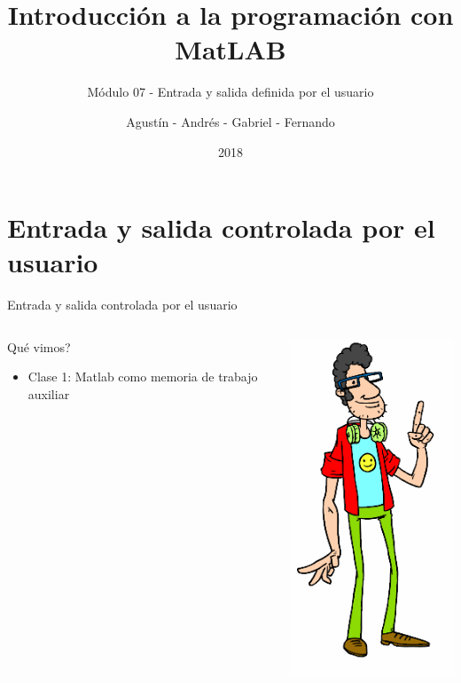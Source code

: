 \documentclass{bredelebeamer}
\title[Programación en MatLAB]{Introducción a la programación con MatLAB}
\subtitle{Módulo 07 - Entrada y salida definida por el usuario}
\author{Agustín - Andrés - Gabriel - Fernando\inst{1}}
\institute[UTN.BA]
{
  \inst{1}%
  Universidad Tecnológica Nacional\\
  Facultad Regional Buenos Aires
  }
\date{2018}
\begin{document}
\begin{frame}
  \titlepage 
\end{frame}





\section{Entrada y salida controlada por el usuario}

\begin{frame}{Entrada y salida controlada por el usuario}
\begin{columns}
\begin{column}{0.5\textwidth}
Qué vimos?
\begin{itemize}
\item Clase 1: Matlab como memoria de trabajo auxiliar
\end{itemize}
\end{column}
\begin{column}{0.5\textwidth}
\begin{center}
\includegraphics[scale=0.3]{images/img42.png}
\end{center}
\end{column}
\end{columns}
\end{frame}
\end{document}
